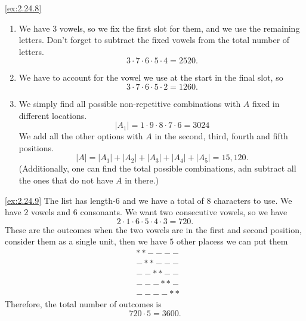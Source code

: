 \begin{solution}\label{sol:2.24.8}\ref{ex:2.24.8}
    \begin{enumerate}
        \item We have $3$ vowels, so we fix the first slot for them, and we use the remaining letters. Don't forget to subtract the fixed vowels from the total number of letters. 
        $$
        3\cdot 7\cdot 6 \cdot 5 \cdot 4 = 2520.
        $$
        \item We have to account for the vowel we use at the start in the final slot, so 
        $$
        3\cdot 7 \cdot 6 \cdot 5 \cdot 2=1260.
        $$
        \item We simply find all possible non-repetitive combinations with $A$ fixed in different locations. 
        $$
        \lvert A_{1} \rvert =1\cdot 9\cdot 8\cdot 7 \cdot 6 =  3024
        $$
        We add all the other options with $A$ in the second, third, fourth and fifth positions. 
        $$
        \lvert A \rvert=\lvert A_{1} \rvert+\lvert A_{2} \rvert + \lvert A_{3} \rvert + \lvert A_{4} \rvert + \lvert A_{5} \rvert=15,120.
        $$
        (Additionally, one can find the total possible combinations, adn subtract all the ones that do not have $A$ in there.)
    \end{enumerate}
\end{solution}

\begin{solution}\label{2.24.9}\ref{ex:2.24.9}
    The list has length-$6$ and we have a total of $8$ characters to use. We have $2$ vowels and $6$ consonants. We want two consecutive vowels, so we have 
    $$
    2\cdot 1 \cdot 6\cdot 5\cdot 4\cdot 3=720.
    $$
    These are the outcomes when the two vowels are in the first and second position, consider them as a single unit, then we have $5$ other placess we can put them 
    $$
    \begin{aligned}
        &**----\\
        &-**---\\
        &--**--\\
        &---**-\\
        &----**
    \end{aligned}
    $$
    Therefore, the total number of outcomes is 
    $$
    720\cdot 5 = 3600.
    $$
\end{solution}

